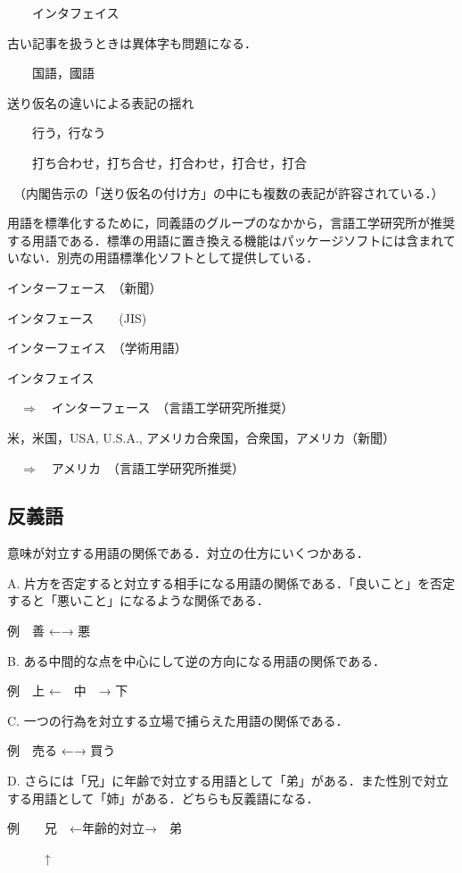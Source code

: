 \documentclass[japanese]{jnlp_1.4}
\begin{document}
　　インタフェイス　　

古い記事を扱うときは異体字も問題になる．

　　国語，國語

送り仮名の違いによる表記の揺れ

　　行う，行なう

　　打ち合わせ，打ち合せ，打合わせ，打合せ，打合

　（内閣告示の「送り仮名の付け方」の中にも複数の表記が許容されている．）


用語を標準化するために，同義語のグループのなかから，言語工学研究所が推奨する用語である．標準の用語に置き換える機能はパッケージソフトには含まれていない．別売の用語標準化ソフトとして提供している．

インターフェース　（新聞）

インタフェース　　(JIS)

インターフェイス　（学術用語）

インタフェイス

　$\Longrightarrow$　{\gtfamily インターフェース}　（言語工学研究所推奨）

米，米国，USA, U.S.A., アメリカ合衆国，合衆国，アメリカ（新聞）

　$\Longrightarrow$　{\gtfamily アメリカ}　（言語工学研究所推奨）



\subsection{反義語}

意味が対立する用語の関係である．対立の仕方にいくつかある．

A. 片方を否定すると対立する相手になる用語の関係である．「良いこと」を否定すると「悪いこと」になるような関係である．

例　善  ←→  悪

B. ある中間的な点を中心にして逆の方向になる用語の関係である．

例　上  ←　中　→  下

C. 一つの行為を対立する立場で捕らえた用語の関係である．

例　売る  ←→  買う

D. さらには「兄」に年齢で対立する用語として「弟」がある．また性別で対立する用語として「姉」がある．どちらも反義語になる．

例　　兄　←年齢的対立→　弟

　　　↑
\end{document}
